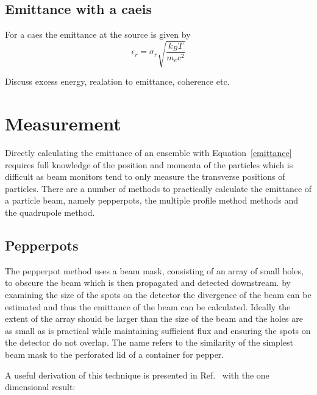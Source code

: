 \subsection{Emittance with a \gls{caeis}}
\label{section:excess_energy_emittance}

For a \gls{caes} the emittance at the source is given by~\cite{mcculloch_high-coherence_2013}
\begin{equation}\label{equation:excess_energy_emittance}
\epsilon_r = \sigma_r \sqrt{\frac{k_B T}{m_e c^2}}
\end{equation}

Discuss excess energy, realation to emittance, coherence etc.

\section{Measurement}

Directly calculating the emittance of an ensemble with Equation~\ref{emittance} requires full knowledge of the position and momenta of the particles which is difficult as beam monitors tend to only measure the transverse positions of particles.
There are a number of methods to practically calculate the emittance of a particle beam, namely pepperpots, the multiple profile method methods and the quadrupole method.

\subsection{Pepperpots}

The pepperpot method uses a beam mask, consisting of an array of small holes, to obscure the beam which is then propagated and detected downstream.
by examining the size of the spots on the detector the divergence of the beam can be estimated and thus the emittance of the beam can be calculated.
Ideally the extent of the array should be larger than the size of the beam and the holes are as small as is practical while maintaining sufficient flux and ensuring the spots on the detector do not overlap.
The name refers to the similarity of the simplest beam mask to the perforated lid of a container for pepper.

A useful derivation of this technique is presented in Ref.~\cite{zhang_emittance_1996} with the one dimensional result:

